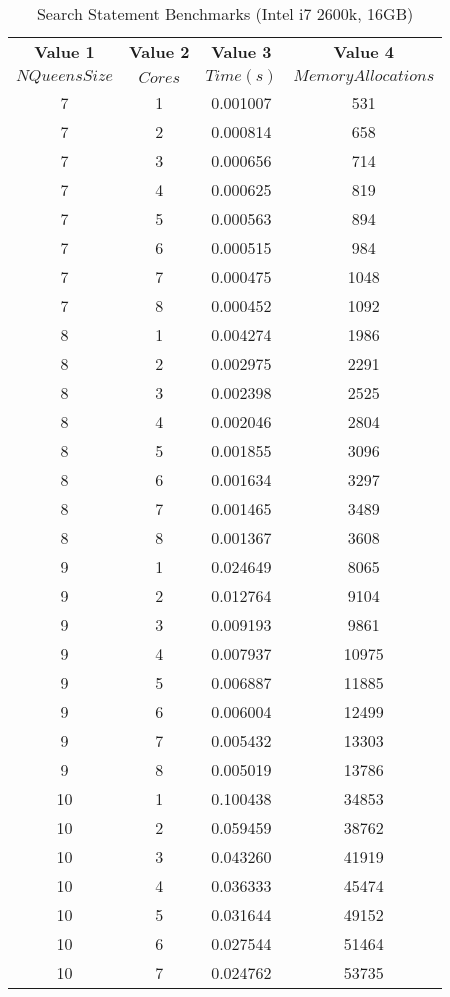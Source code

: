 \documentclass{article}
\begin{document}
\begin{table}[h!]
  \begin{center}
    \caption{Search Statement Benchmarks (Intel i7 2600k, 16GB)}
    \label{tab:table2}
    \begin{tabular}{c|c|c|c} %
      \textbf{Value 1} & \textbf{Value 2} & \textbf{Value 3} & \textbf{Value 4}\\
      $NQueens Size$ & $Cores$ & $Time(s)$ & $Memory Allocations$ \\
      \hline
7 & 1 & 0.001007 & 531\\
7 & 2 & 0.000814 & 658\\
7 & 3 & 0.000656 & 714\\
7 & 4 & 0.000625 & 819\\
7 & 5 & 0.000563 & 894\\
7 & 6 & 0.000515 & 984\\
7 & 7 & 0.000475 & 1048\\
7 & 8 & 0.000452 & 1092\\
8 & 1 & 0.004274 & 1986\\
8 & 2 & 0.002975 & 2291\\
8 & 3 & 0.002398 & 2525\\
8 & 4 & 0.002046 & 2804\\
8 & 5 & 0.001855 & 3096\\
8 & 6 & 0.001634 & 3297\\
8 & 7 & 0.001465 & 3489\\
8 & 8 & 0.001367 & 3608\\
9 & 1 & 0.024649 & 8065\\
9 & 2 & 0.012764 & 9104\\
9 & 3 & 0.009193 & 9861\\
9 & 4 & 0.007937 & 10975\\
9 & 5 & 0.006887 & 11885\\
9 & 6 & 0.006004 & 12499\\
9 & 7 & 0.005432 & 13303\\
9 & 8 & 0.005019 & 13786\\
10 & 1 & 0.100438 & 34853\\
10 & 2 & 0.059459 & 38762\\
10 & 3 & 0.043260 & 41919\\
10 & 4 & 0.036333 & 45474\\
10 & 5 & 0.031644 & 49152\\
10 & 6 & 0.027544 & 51464\\
10 & 7 & 0.024762 & 53735\\

\end{tabular}
\end{center}
\end{table}
\end{document}
